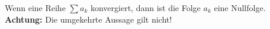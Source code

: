Wenn eine Reihe $\sum a_k$ konvergiert, dann ist die Folge $a_k$ eine Nullfolge.
\\
\textbf{Achtung:} Die umgekehrte Aussage gilt nicht!